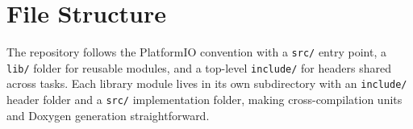 \documentclass[11pt,a4paper]{article}
\begin{document}
\newpage

\section{File Structure}
\vspace{10pt}

The repository follows the PlatformIO convention with a \texttt{src/} entry point, a
\texttt{lib/} folder for reusable modules, and a top-level \texttt{include/} for headers
shared across tasks. Each library module lives in its own subdirectory with an \texttt{include/}
header folder and a \texttt{src/} implementation folder, making cross-compilation units and
Doxygen generation straightforward.

\vspace{5pt}
\end{document}
